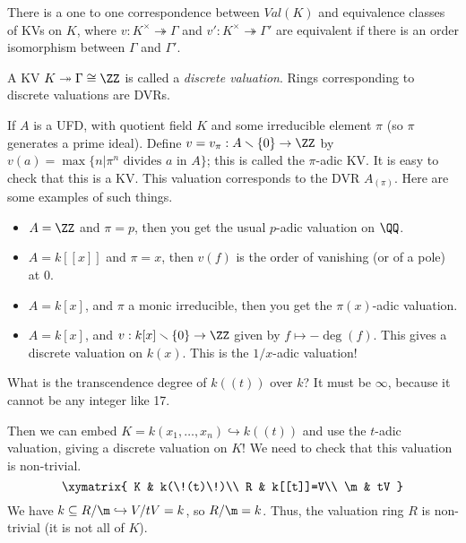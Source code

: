  \begin{corollary}
   There is a one to one correspondence between $Val(K)$ and equivalence classes of KVs
   on $K$, where $v:K^\times\twoheadrightarrow \Gamma$ and $v':K^\times\twoheadrightarrow
   \Gamma'$ are equivalent if there is an order isomorphism between $\Gamma$ and
   $\Gamma'$.
 \end{corollary}
 \begin{definition}
   A KV $K\twoheadrightarrow \Gamma\cong \ZZ$ is called a \emph{discrete valuation}.
   Rings corresponding to discrete valuations are DVRs.
 \end{definition}
 \begin{example}
   If $A$ is a UFD, with quotient field $K$ and some irreducible element $\pi$ (so $\pi$
   generates a prime ideal). Define $v=v_\pi:A\smallsetminus\{0\}\to \ZZ$ by
   $v(a)=\max\{n|\pi^n\text{ divides } a \text{ in } A\}$; this is called the $\pi$-adic
   KV. It is easy to check that this is a KV. This valuation corresponds to the DVR
   $A_{(\pi)}$. Here are some examples of such things.
   \begin{itemize}
     \item $A=\ZZ$ and $\pi=p$, then you get the usual $p$-adic valuation on $\QQ$.
     \item $A=k[[x]]$ and $\pi=x$, then $v(f)$ is the order of vanishing (or of a pole) at
     0.
     \item $A=k[x]$, and $\pi$ a monic irreducible, then you get the $\pi(x)$-adic
     valuation.
     \item $A=k[x]$, and $v:k[x]\smallsetminus\{0\}\to \ZZ$ given by $f\mapsto -\deg(f)$.
     This gives a discrete valuation on $k(x)$. This is the $1/x$-adic valuation!
   \end{itemize}
 \end{example}
 \begin{example}
   What is the transcendence degree of $k(\!(t)\!)$ over $k$? It must be $\infty$,
   because it cannot be any integer like 17.

   Then we can embed $K=k(x_1,\dots, x_n)\hookrightarrow k(\!(t)\!)$ and use the $t$-adic
   valuation, giving a discrete valuation on $K$! We need to check that this valuation is
   non-trivial.
   \[\xymatrix{
    K & k(\!(t)\!)\\
    R & k[[t]]=V\\
    \m & tV
   }\]
   We have $k\subseteq R/\m\hookrightarrow V/tV=k$, so $R/\m=k$. Thus, the valuation ring
   $R$ is non-trivial (it is not all of $K$).
 \end{example}

